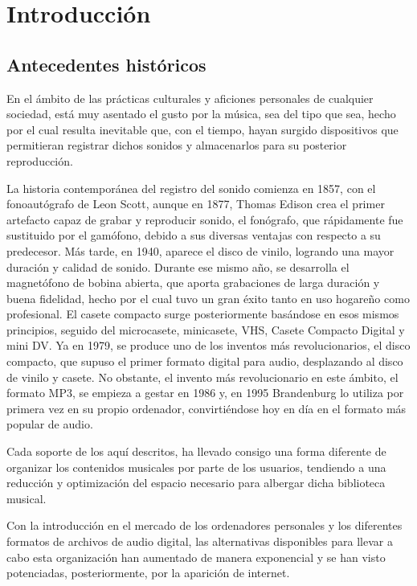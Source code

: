 \chapter{Introducción}
\label{cap:introduccion}

\section{Antecedentes históricos}

En el ámbito de las prácticas culturales y aficiones personales de cualquier sociedad, está muy asentado el gusto por la música, sea del tipo que sea, hecho por el cual resulta inevitable que, con el tiempo, hayan surgido dispositivos que permitieran registrar dichos sonidos y almacenarlos para su posterior reproducción.

La historia contemporánea del registro del sonido comienza en 1857, con el fonoautógrafo de Leon Scott, aunque en 1877, Thomas Edison crea el primer artefacto capaz de grabar y reproducir sonido, el fonógrafo, que rápidamente fue sustituido por el gamófono, debido a sus diversas ventajas con respecto a su predecesor. Más tarde, en 1940, aparece el disco de vinilo, logrando una mayor duración y calidad de sonido. Durante ese mismo año, se desarrolla el magnetófono de bobina abierta, que aporta grabaciones de larga duración y buena fidelidad, hecho por el cual tuvo un gran éxito tanto en uso hogareño como profesional. El casete compacto surge posteriormente basándose en esos mismos principios, seguido del microcasete, minicasete, VHS, Casete Compacto Digital y mini DV. Ya en 1979, se produce uno de los inventos más revolucionarios, el disco compacto, que supuso el primer formato digital para audio, desplazando al disco de vinilo y casete. No obstante, el invento más revolucionario en este ámbito, el formato MP3, se empieza a gestar en 1986 y, en 1995 Brandenburg lo utiliza por primera vez en su propio ordenador, convirtiéndose hoy en día en el formato más popular de audio.

Cada soporte de los aquí descritos, ha llevado consigo una forma diferente de organizar los contenidos musicales por parte de los usuarios, tendiendo a una reducción y optimización del espacio necesario para albergar dicha biblioteca musical. 

Con la introducción en el mercado de los ordenadores personales y los diferentes formatos de archivos de audio digital, las alternativas disponibles para llevar a cabo esta organización han aumentado de manera exponencial y se han visto potenciadas, posteriormente, por la aparición de internet.

